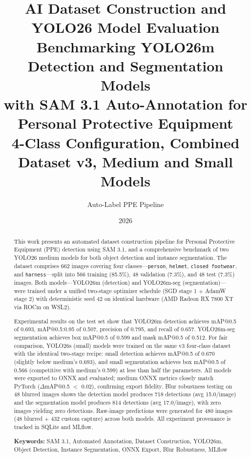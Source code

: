 \documentclass[a4paper,11pt]{article}
\title{\Large\textbf{AI Dataset Construction and YOLO26 Model Evaluation}\\[4pt]
       \normalsize Benchmarking YOLO26m Detection and Segmentation Models\\
       with SAM 3.1 Auto-Annotation for Personal Protective Equipment\\[2pt]
       \small 4-Class Configuration, Combined Dataset v3, Medium and Small Models}
\author{Auto-Label PPE Pipeline}
\date{2026}
\begin{document}
\maketitle
\thispagestyle{empty}

\begin{abstract}
\renewcommand{\abstractname}{Abstract}
\noindent
This work presents an automated dataset construction pipeline for Personal Protective Equipment (PPE) detection using SAM 3.1, and a comprehensive benchmark of two YOLO26 medium models for both object detection and instance segmentation. The dataset comprises 662 images covering four classes---\texttt{person}, \texttt{helmet}, \texttt{closed footwear}, and \texttt{harness}---split into 566 training (85.5\%), 48 validation (7.3\%), and 48 test (7.3\%) images. Both models---YOLO26m (detection) and YOLO26m-seg (segmentation)---were trained under a unified two-stage optimizer schedule (SGD stage 1 + AdamW stage 2) with deterministic seed 42 on identical hardware (AMD Radeon RX 7800 XT via ROCm on WSL2).

Experimental results on the test set show that YOLO26m detection achieves mAP@0.5 of 0.693, mAP@0.5:0.95 of 0.507, precision of 0.795, and recall of 0.657. YOLO26m-seg segmentation achieves box mAP@0.5 of 0.599 and mask mAP@0.5 of 0.512. For fair comparison, YOLO26s (small) models were trained on the same v3 four-class dataset with the identical two-stage recipe: small detection achieves mAP@0.5 of 0.670 (slightly below medium's 0.693), and small segmentation achieves box mAP@0.5 of 0.566 (competitive with medium's 0.599) at less than half the parameters. All models were exported to ONNX and evaluated; medium ONNX metrics closely match PyTorch ($\Delta$mAP@0.5 $<$ 0.02), confirming export fidelity. Blur robustness testing on 48 blurred images shows the detection model produces 718 detections (avg 15.0/image) and the segmentation model produces 814 detections (avg 17.0/image), with zero images yielding zero detections. Raw-image predictions were generated for 480 images (48 blurred + 432 custom capture) across both models. All experiment provenance is tracked in SQLite and MLflow.

\vspace{8pt}
\noindent\textbf{Keywords:} SAM 3.1, Automated Annotation, Dataset Construction, YOLO26m, Object Detection, Instance Segmentation, ONNX Export, Blur Robustness, MLflow
\end{abstract}
\end{document}
